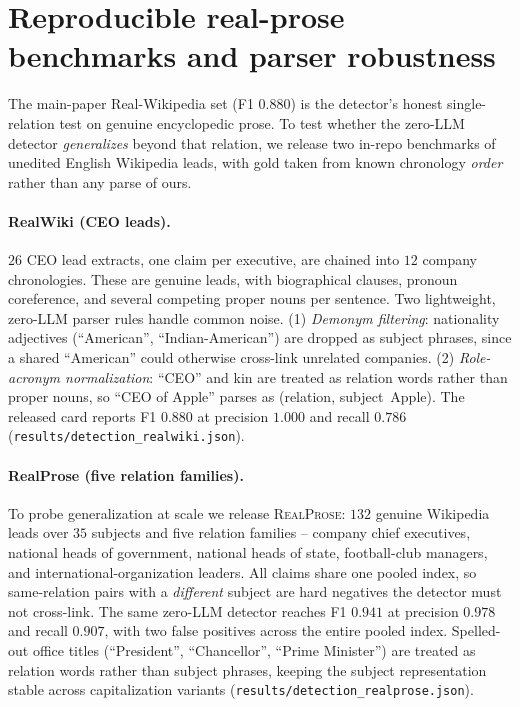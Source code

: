 \documentclass[letterpaper]{article}
\begin{document}
\section{Reproducible real-prose benchmarks and parser robustness}
\label{sec:supp_realprose}
The main-paper Real-Wikipedia set (F1 $0.880$) is the detector's honest single-relation test on genuine encyclopedic prose. To test whether the zero-LLM detector \emph{generalizes} beyond that relation, we release two in-repo benchmarks of unedited English Wikipedia leads, with gold taken from known chronology \emph{order} rather than any parse of ours.

\paragraph{RealWiki (CEO leads).} $26$ CEO lead extracts, one claim per executive, are chained into $12$ company chronologies. These are genuine leads, with biographical clauses, pronoun coreference, and several competing proper nouns per sentence. Two lightweight, zero-LLM parser rules handle common noise. (1) \emph{Demonym filtering}: nationality adjectives (``American'', ``Indian-American'') are dropped as subject phrases, since a shared ``American'' could otherwise cross-link unrelated companies. (2) \emph{Role-acronym normalization}: ``CEO'' and kin are treated as relation words rather than proper nouns, so ``CEO of Apple'' parses as (relation, subject~Apple). The released card reports F1 $0.880$ at precision $1.000$ and recall $0.786$ (\texttt{results/detection\_realwiki.json}).

\paragraph{RealProse (five relation families).} To probe generalization at scale we release \textsc{RealProse}: $132$ genuine Wikipedia leads over $35$ subjects and five relation families -- company chief executives, national heads of government, national heads of state, football-club managers, and international-organization leaders. All claims share one pooled index, so same-relation pairs with a \emph{different} subject are hard negatives the detector must not cross-link. The same zero-LLM detector reaches F1 $0.941$ at precision $0.978$ and recall $0.907$, with two false positives across the entire pooled index. Spelled-out office titles (``President'', ``Chancellor'', ``Prime Minister'') are treated as relation words rather than subject phrases, keeping the subject representation stable across capitalization variants (\texttt{results/detection\_realprose.json}).
\end{document}
